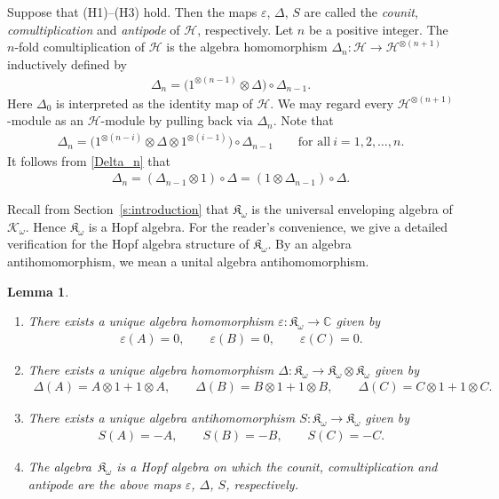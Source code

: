 \documentclass[10pt,a4paper]{amsart}
\def\C{\mathbb C}
\def\H{\mathcal H}
\def\K{\mathfrak K_\omega}
\def\e{\varepsilon}
\numberwithin{equation}{section}
\newtheorem{Lemma}[Theorem]{Lemma}
\begin{document}
Suppose that (H1)--(H3) hold. Then the maps $\e$, $\Delta$, $S$ are called the {\it counit}, {\it comultiplication} and {\it antipode} of $\H$, respectively. Let $n$ be a positive integer.
The $n$-fold comultiplication of $\H$ is the algebra homomorphism $\Delta_n\colon \H\to \H^{\otimes (n+1)}$ inductively defined by
\begin{gather*}
\Delta_n=\big(1^{\otimes(n-1)}\otimes \Delta\big)\circ \Delta_{n-1}.
\end{gather*}
Here $\Delta_0$ is interpreted as the identity map of $\H$.
We may regard every $\H^{\otimes (n+1)}$-module as an $\H$-module by pulling back via $\Delta_n$. Note that
\begin{gather}\label{Delta_n}
\Delta_n=\big(1^{\otimes(n-i)}\otimes \Delta\otimes 1^{\otimes (i-1)}\big)\circ \Delta_{n-1}\qquad
\text{for all} \ i=1,2,\dots,n.
\end{gather}
It follows from \eqref{Delta_n} that
\begin{gather}\label{Delta_n'}
\Delta_n=(\Delta_{n-1}\otimes 1)\circ \Delta=(1\otimes \Delta_{n-1})\circ \Delta.
\end{gather}

Recall from Section~\ref{s:introduction} that $\K$ is the universal enveloping algebra of $\mathcal K_\omega$. Hence $\K$ is a Hopf algebra.
For the reader's convenience, we give a detailed verification for the Hopf algebra structure of $\K$. By an algebra antihomomorphism, we mean a unital algebra antihomomorphism.

{\samepage\begin{Lemma}\label{lem:Hopf_K}\quad
\begin{enumerate}\itemsep=0pt
\item[$(i)$] There exists a unique algebra homomorphism $\e\colon \K\to \C$ given by
\begin{gather*}
\e(A)=0,\qquad
\e(B)=0,\qquad
\e(C)=0.
\end{gather*}

\item[$(ii)$] There exists a unique algebra homomorphism $\Delta\colon \K\to \K\otimes \K$ given by
\begin{gather*}
\Delta(A)=A\otimes 1+1\otimes A,\qquad
\Delta(B)=B\otimes 1+1\otimes B,\qquad
\Delta(C)=C\otimes 1+1\otimes C.
\end{gather*}

\item[$(iii)$] There exists a unique algebra antihomomorphism $S\colon \K\to \K$ given by
\begin{gather*}
S(A)=-A,\qquad
S(B)=-B,\qquad
S(C)=-C.
\end{gather*}

\item[$(iv)$] The algebra~$\K$ is a Hopf algebra on which the counit, comultiplication and antipode are the above maps $\e$, $\Delta$, $S$, respectively.
\end{enumerate}
\end{Lemma}}
\end{document}
